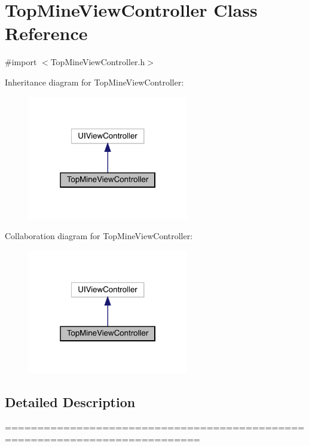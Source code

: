 \hypertarget{interface_top_mine_view_controller}{}\section{Top\+Mine\+View\+Controller Class Reference}
\label{interface_top_mine_view_controller}


{\ttfamily \#import $<$Top\+Mine\+View\+Controller.\+h$>$}



Inheritance diagram for Top\+Mine\+View\+Controller\+:\nopagebreak
\begin{figure}[H]
\begin{center}
\leavevmode
\includegraphics[width=199pt]{interface_top_mine_view_controller__inherit__graph}
\end{center}
\end{figure}


Collaboration diagram for Top\+Mine\+View\+Controller\+:\nopagebreak
\begin{figure}[H]
\begin{center}
\leavevmode
\includegraphics[width=199pt]{interface_top_mine_view_controller__coll__graph}
\end{center}
\end{figure}


\subsection{Detailed Description}
============================================================================

